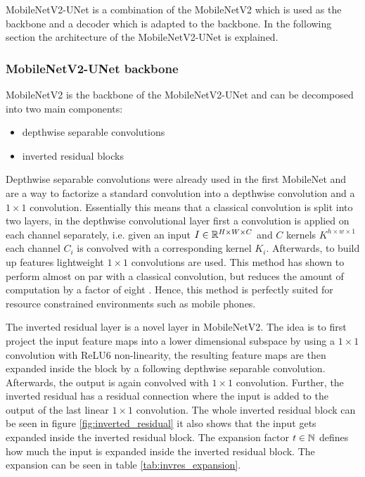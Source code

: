 MobileNetV2-UNet is a combination of the MobileNetV2 \cite{mnetv2} which is used as the backbone and a decoder which is adapted to the backbone.
In the following section the architecture of the MobileNetV2-UNet is explained.

\subsubsection{MobileNetV2-UNet backbone}

MobileNetV2 is the backbone of the MobileNetV2-UNet and can be decomposed into two main components:

\begin{itemize}
    \item depthwise separable convolutions
    \item inverted residual blocks
\end{itemize}

Depthwise separable convolutions were already used in the first MobileNet and are a way to factorize a standard convolution into a depthwise convolution and a $1\times1$ convolution.
Essentially this means that a classical convolution is split into two layers, in the depthwise convolutional layer first a convolution is applied on each channel separately, i.e. given an input $I \in \mathbb{R}^{H \times W \times C}$ and $C$ kernels $K^{h \times w \times 1}$ each channel $C_i$ is convolved with a corresponding kernel $K_i$.
Afterwards, to build up features lightweight $1 \times 1$ convolutions are used.
This method has shown to perform almost on par with a classical convolution, but reduces the amount of computation by a factor of eight \cite{mnetv1}.
Hence, this method is perfectly suited for resource constrained environments such as mobile phones.

The inverted residual layer is a novel layer in MobileNetV2.
The idea is to first project the input feature maps into a lower dimensional subspace by using a $1 \times 1$ convolution with ReLU6 non-linearity, the resulting feature maps are then expanded inside the block by a following depthwise separable convolution.
Afterwards, the output is again convolved with $1 \times 1$ convolution.
Further, the inverted residual has a residual connection where the input is added to the output of the last linear $1 \times 1$ convolution.
The whole inverted residual block can be seen in figure \ref{fig:inverted_residual} it also shows that the input gets expanded inside the inverted residual block.
The expansion factor $t \in \mathbb{N}$ defines how much the input is expanded inside the inverted residual block.
The expansion can be seen in table \ref{tab:invres_expansion}.

